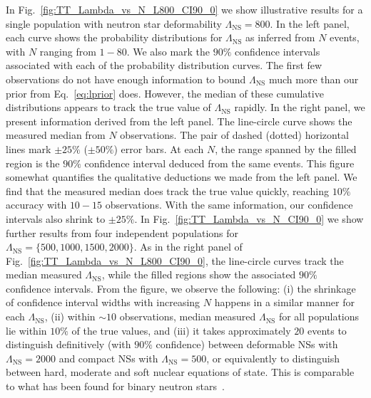 \documentclass[aps,prd,amsmath,floats,floatfix, twocolumn,
superscriptaddress,nofootinbib,showpacs]{revtex4-1}
\newcommand{\lambdans}{\Lambda_\mathrm{NS}}
\begin{document}
In Fig.~\ref{fig:TT_Lambda_vs_N_L800_CI90_0} we show illustrative results
for a single population with neutron star deformability $\lambdans=800$.
In the left panel, each curve shows the 
probability distributions for $\lambdans$ as inferred from $N$ events, with $N$
ranging from $1-80$. We also mark the $90\%$ confidence intervals associated
with each of the probability distribution curves. The first few observations
do not have
enough information to bound $\lambdans$ much more than
our prior from Eq.~\ref{eq:lprior} does. However, the median of these
cumulative distributions appears to track the true value of $\lambdans$ 
rapidly.
% 
In the right panel, we present information derived from the left panel.
The line-circle curve shows the measured median from $N$ observations.
The pair of dashed (dotted) horizontal lines mark
$\pm25\%$ ($\pm50\%$) error bars. At each $N$, the range spanned by the 
filled region is the $90\%$ confidence interval deduced from the same 
events. This figure somewhat quantifies the qualitative deductions we made
from the left panel. We find that the measured median does track the true value
quickly, reaching $10\%$ accuracy with $10-15$ observations. With the same
information, our confidence intervals also shrink to $\pm 25\%$.
% 
In Fig.~\ref{fig:TT_Lambda_vs_N_CI90_0} we show further results from four
independent populations for $\lambdans=\{500,1000,1500,2000\}$. As in the 
right panel of Fig.~\ref{fig:TT_Lambda_vs_N_L800_CI90_0}, the line-circle curves
track the median measured $\lambdans$, while the filled regions show
the associated $90\%$ confidence intervals. From the figure, we observe
the following: (i) the shrinkage of confidence interval widths with increasing
$N$ happens in a similar manner for each $\lambdans$, (ii) within $\sim 10$
observations, median measured $\lambdans$ for all populations lie within
$10\%$ of the true values, and (iii) it takes
approximately $20$ events to distinguish definitively (with $90\%$ confidence)
between deformable NSs with $\lambdans=2000$ and compact NSs with 
$\lambdans=500$, or equivalently to distinguish between hard, moderate and soft
nuclear equations of state. This is comparable to what has been found for
binary neutron stars~\cite{DelPozzo:13,Chatziioannou:2015uea,Agathos:2015a}.
\end{document}
